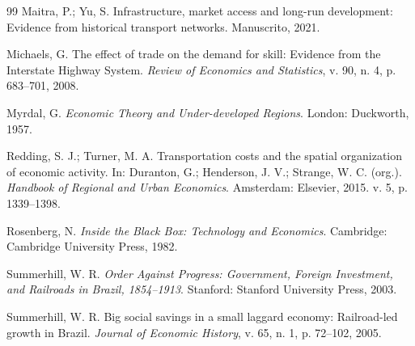 \documentclass[12pt,a4paper]{article}
\begin{document}
\begin{thebibliography}{99}
Maitra, P.; Yu, S. Infrastructure, market access and long-run development: Evidence from historical transport networks. Manuscrito, 2021.


Michaels, G. The effect of trade on the demand for skill: Evidence from the Interstate Highway System. \textit{Review of Economics and Statistics}, v. 90, n. 4, p. 683--701, 2008.

Myrdal, G. \textit{Economic Theory and Under-developed Regions}. London: Duckworth, 1957.

Redding, S. J.; Turner, M. A. Transportation costs and the spatial organization of economic activity. In: Duranton, G.; Henderson, J. V.; Strange, W. C. (org.). \textit{Handbook of Regional and Urban Economics}. Amsterdam: Elsevier, 2015. v. 5, p. 1339--1398.

Rosenberg, N. \textit{Inside the Black Box: Technology and Economics}. Cambridge: Cambridge University Press, 1982.

Summerhill, W. R. \textit{Order Against Progress: Government, Foreign Investment, and Railroads in Brazil, 1854--1913}. Stanford: Stanford University Press, 2003.

Summerhill, W. R. Big social savings in a small laggard economy: Railroad-led growth in Brazil. \textit{Journal of Economic History}, v. 65, n. 1, p. 72--102, 2005.

\end{thebibliography}
\end{document}
